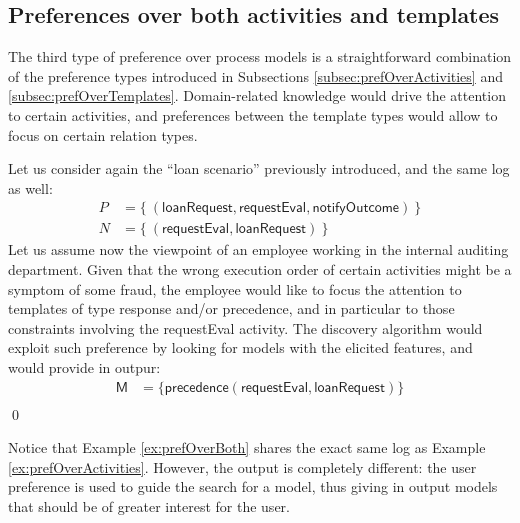 \subsection{Preferences over both activities and templates}
\label{sub:prefOverBoth}


The third type of preference over process models is a straightforward combination of the preference types introduced in Subsections \ref{subsec:prefOverActivities} and \ref{subsec:prefOverTemplates}. Domain-related knowledge would drive the attention to certain activities, and preferences between the template types would allow to focus on certain relation types.


\begin{example}
\label{ex:prefOverBoth}
Let us consider again the ``loan scenario'' previously introduced, and the same log as well:
%
\begin{align*}
P & = \{\ (\mathsf{loanRequest}, \mathsf{requestEval}, \mathsf{notifyOutcome})\ \} \\
N & = \{\ (\mathsf{requestEval}, \mathsf{loanRequest})\ \}
\end{align*}
%
Let us assume now the viewpoint of an employee working in the internal auditing department. Given that the wrong execution order of certain activities might be a symptom of some fraud, the employee would like to focus the attention to templates of type \textsf{response} and/or \textsf{precedence}, and in particular to those constraints involving the \textsf{requestEval} activity. The discovery algorithm would exploit such preference by looking for models with the elicited features, and would provide in outpur:
%
\begin{align*}
\mathsf{M} & = \{ \mathsf{precedence(requestEval,loanRequest)}\} \\
\end{align*}
%
\qed
%
\end{example}

Notice that Example \ref{ex:prefOverBoth} shares the exact same log as Example \ref{ex:prefOverActivities}. However, the output is completely different: the user preference is used to guide the search for a model, thus giving in output models that should be of greater interest for the user.